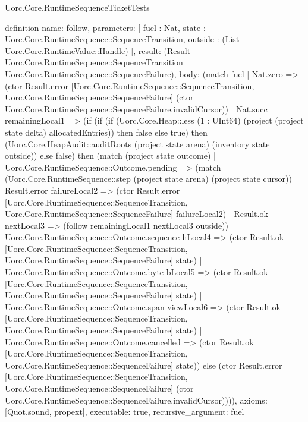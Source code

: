 \begin{lexlean}{Uorc.Core.RuntimeSequenceTicketTests}
\begin{semanticmodule}
definition{
  name: follow,
  parameters: [
    fuel : Nat,
    state : Uorc.Core.RuntimeSequence::SequenceTransition,
    outside : (List Uorc.Core.RuntimeValue::Handle)
  ],
  result: (Result Uorc.Core.RuntimeSequence::SequenceTransition Uorc.Core.RuntimeSequence::SequenceFailure),
  body: (match fuel
    | Nat.zero => (ctor Result.error [Uorc.Core.RuntimeSequence::SequenceTransition, Uorc.Core.RuntimeSequence::SequenceFailure] (ctor Uorc.Core.RuntimeSequence::SequenceFailure.invalidCursor))
    | Nat.succ remainingLocal1 => (if (if (if (Uorc.Core.Heap::less (1 : UInt64) (project (project state delta) allocatedEntries)) then false else true) then (Uorc.Core.HeapAudit::auditRoots (project state arena) (inventory state outside)) else false) then (match (project state outcome)
      | Uorc.Core.RuntimeSequence::Outcome.pending => (match (Uorc.Core.RuntimeSequence::step (project state arena) (project state cursor))
        | Result.error failureLocal2 => (ctor Result.error [Uorc.Core.RuntimeSequence::SequenceTransition, Uorc.Core.RuntimeSequence::SequenceFailure] failureLocal2)
        | Result.ok nextLocal3 => (follow remainingLocal1 nextLocal3 outside))
      | Uorc.Core.RuntimeSequence::Outcome.sequence hLocal4 => (ctor Result.ok [Uorc.Core.RuntimeSequence::SequenceTransition, Uorc.Core.RuntimeSequence::SequenceFailure] state)
      | Uorc.Core.RuntimeSequence::Outcome.byte bLocal5 => (ctor Result.ok [Uorc.Core.RuntimeSequence::SequenceTransition, Uorc.Core.RuntimeSequence::SequenceFailure] state)
      | Uorc.Core.RuntimeSequence::Outcome.span viewLocal6 => (ctor Result.ok [Uorc.Core.RuntimeSequence::SequenceTransition, Uorc.Core.RuntimeSequence::SequenceFailure] state)
      | Uorc.Core.RuntimeSequence::Outcome.cancelled => (ctor Result.ok [Uorc.Core.RuntimeSequence::SequenceTransition, Uorc.Core.RuntimeSequence::SequenceFailure] state)) else (ctor Result.error [Uorc.Core.RuntimeSequence::SequenceTransition, Uorc.Core.RuntimeSequence::SequenceFailure] (ctor Uorc.Core.RuntimeSequence::SequenceFailure.invalidCursor)))),
  axioms: [Quot.sound, propext],
  executable: true,
  recursive_argument: fuel
}


\end{semanticmodule}
\end{lexlean}
